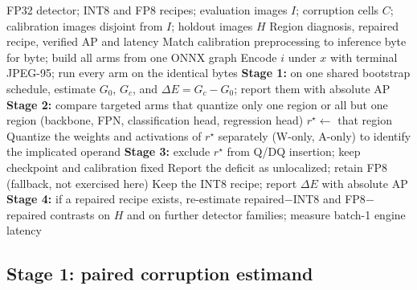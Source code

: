 \documentclass[a4paper,fleqn]{cas-dc}
\newcommand{\Jclean}{\mathrm{J95}}
\begin{document}
\begin{algorithm}[t]
\caption{Paired diagnosis and selective-precision repair (PDR), stated as a retrospective workflow of the analyses reported here}
\label{alg:pdr}
\small
\begin{algorithmic}[1]
\Require FP32 detector; INT8 and FP8 recipes; evaluation images $I$; corruption cells $C$; calibration images disjoint from $I$; holdout images $H$
\Ensure Region diagnosis, repaired recipe, verified AP and latency
\State Match calibration preprocessing to inference byte for byte; build all arms from one ONNX graph
\ForAll{$i\in I$, $x\in\{\Jclean\}\cup C$}
  \State Encode $i$ under $x$ with terminal JPEG-95; run every arm on the identical bytes
\EndFor
\State \textbf{Stage 1:} on one shared bootstrap schedule, estimate $G_0$, $G_c$, and $\Delta E=G_c-G_0$; report them with absolute AP
  \State \textbf{Stage 2:} compare targeted arms that quantize only one region or all but one region (backbone, FPN, classification head, regression head)
    \State $r^\star\gets$ that region
    \State Quantize the weights and activations of $r^\star$ separately (W-only, A-only) to identify the implicated operand
    \State \textbf{Stage 3:} exclude $r^\star$ from Q/DQ insertion; keep checkpoint and calibration fixed
  \Else
    \State Report the deficit as unlocalized; retain FP8 (fallback, not exercised here)
  \EndIf
\Else
  \State Keep the INT8 recipe; report $\Delta E$ with absolute AP
\EndIf
\State \textbf{Stage 4:} if a repaired recipe exists, re-estimate repaired$-$INT8 and FP8$-$repaired contrasts on $H$ and on further detector families; measure batch-1 engine latency
\end{algorithmic}
\end{algorithm}

\subsection{Stage 1: paired corruption estimand}
\label{sec:estimands}
\end{document}
